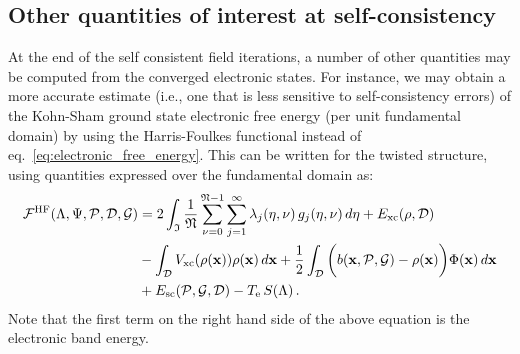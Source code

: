 \documentclass[preprint,12pt, 3p, sort&compress]{elsarticle}
\begin{document}
\subsection{Other quantities of interest at self-consistency}
\label{subsec:other_quantities}
At the end of the self consistent field iterations, a number of other quantities may be computed from the converged electronic states. For instance, we may obtain a more accurate estimate {(i.e., one that is less sensitive to self-consistency errors)} of the {Kohn-Sham ground  state electronic free energy} (per unit fundamental domain) by using the Harris-Foulkes functional \citep{harris1985simplified,foulkes1989tight} instead of eq.~\ref{eq:electronic_free_energy}. This can be written for the twisted structure, using quantities expressed over the fundamental domain as:
\begin{align}
\nonumber
{{\cal F}}^{\text{HF}}(\Lambda, \Psi, {\cal P}, {{\cal D}}, {\cal G}) &=  2\int_{\mathfrak{I}}\frac{1}{\mathfrak{N}}\sum_{\nu = 0}^{\mathfrak{N}-1}\sum_{j=1}^{\infty}\lambda_j(\eta, \nu)\,g_j(\eta, \nu)\,d\eta + E_{\text{xc}}(\rho, {{\cal D}}) \\\nonumber &-\int_{ {{\cal D}}}V_{\text{xc}}(\rho({\bf x}))\rho({\bf x})\,d{\bf x}
+\frac{1}{2}\int_{{{\cal D}}}\bigg(b({\bf x}, {\cal P}, {\cal G}) - \rho({\bf x}) \bigg)\Phi({\bf x})\,d{\bf x} \\&+ E_{\text{sc}}({\cal P} ,{\cal G}, {{\cal D}}) - T_{\text{e}}\,S(\Lambda)\,.
\label{eq:Harris_Foulkes}
\end{align}
Note that the first term on the right hand side of the above equation is the electronic band energy.
\end{document}
